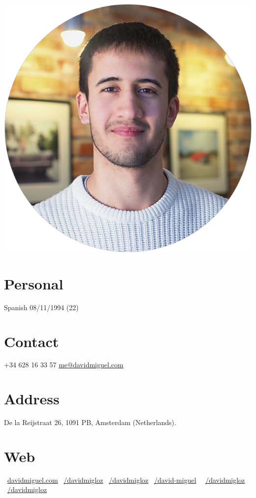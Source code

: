 \documentclass[]{friggeri-cv}
\begin{document}
      

\begin{aside}
  \includegraphics[scale=0.18]{img/profile.png}
  \section{Personal}
    Spanish
    08/11/1994 (22)
    ~  
  \section{Contact}
    +34 628 16 33 57
    \href{mailto:me@davidmiguel.com}{me@davidmiguel.com}
    ~  
  \section{Address}
    De la Reijstraat 26,
    1091 PB, Amsterdam
    (Netherlands).
    ~    
  \section{Web}
    \faGlobe\ \href{http://davidmiguel.com}{davidmiguel.com}
    \faLinkedin\ \href{https://www.linkedin.com/in/davidmigloz}{/davidmigloz}
    \faGithub\ \href{https://github.com/davidmigloz/}{/davidmigloz}
    \faStackOverflow\ \href{http://stackoverflow.com/users/6305235/david-miguel}{/david-miguel}    
    \faFacebook\ \ \href{https://www.facebook.com/DavidMigLoz}{/davidmigloz}
    \faTwitter\ \href{https://twitter.com/DavidMigLoz}{/davidmigloz}
    ~

\end{aside}
\end{document}
